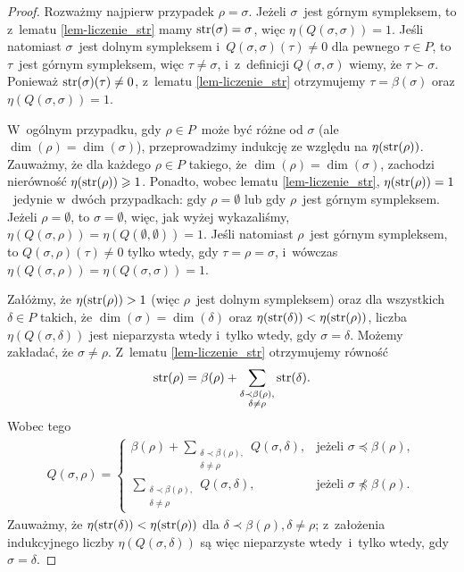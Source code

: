 \begin{proof}
Rozważmy najpierw przypadek $\rho=\sigma$. Jeżeli $\sigma$~jest górnym sympleksem, to z~lematu \ref{lem-liczenie_str} mamy $\operatorname{str}(\sigma)=\sigma$, więc $\eta(Q(\sigma,\sigma))=1$. Jeśli natomiast $\sigma$~jest dolnym sympleksem i~$Q(\sigma,\sigma)(\tau)\not=0$ dla pewnego $\tau\in P$, to $\tau$~jest górnym sympleksem, więc $\tau\not=\sigma$, i~z~definicji $Q(\sigma,\sigma)$ wiemy, że $\tau\succ\sigma$. Ponieważ $\operatorname{str}(\sigma)(\tau)\not=0$, z~lematu \ref{lem-liczenie_str} otrzymujemy $\tau=\beta(\sigma)$ oraz $\eta(Q(\sigma,\sigma))=1$.

W~ogólnym przypadku, gdy $\rho\in P$~może być różne od $\sigma$ (ale $\dim(\rho)=\dim(\sigma)$), przeprowadzimy indukcję ze względu na $\eta(\operatorname{str}(\rho))$. Zauważmy, że dla każdego $\rho\in P$ takiego, że $\dim(\rho)=\dim(\sigma)$, zachodzi nierówność $\eta(\operatorname{str}(\rho))\geqslant 1$. Ponadto, wobec lematu \ref{lem-liczenie_str}, $\eta(\operatorname{str}(\rho))=1$~jedynie w~dwóch przypadkach: gdy $\rho=\emptyset$ lub gdy $\rho$~jest górnym sympleksem. Jeżeli $\rho=\emptyset$, to $\sigma=\emptyset$, więc, jak wyżej wykazaliśmy, $\eta(Q(\sigma,\rho))=\eta(Q(\emptyset,\emptyset))=1$. Jeśli natomiast $\rho$~jest górnym sympleksem, to $Q(\sigma,\rho)(\tau)\not=0$ tylko wtedy, gdy $\tau=\rho=\sigma$, i~wówczas $\eta(Q(\sigma,\rho))=\eta(Q(\sigma,\sigma))=1$.

Załóżmy, że $\eta(\operatorname{str}(\rho))>1$ (więc $\rho$~jest dolnym sympleksem) oraz dla wszystkich $\delta\in P$ takich, że $\dim(\sigma)=\dim(\delta)$ oraz $\eta(\operatorname{str}(\delta))<\eta(\operatorname{str}(\rho))$, liczba $\eta(Q(\sigma,\delta))$ jest nieparzysta wtedy i~tylko wtedy, gdy $\sigma=\delta$. Możemy zakładać, że $\sigma\not=\rho$. Z~lematu \ref{lem-liczenie_str} otrzymujemy równość \[\operatorname{str}(\rho)=\beta(\rho)+\sum_{\substack{\delta\prec\beta(\rho),\\\delta\not=\rho}}\operatorname{str}(\delta).\] Wobec tego \begin{align}Q(\sigma,\rho)=\begin{cases}\beta(\rho)+\sum\limits_{\substack{\delta\prec\beta(\rho),\\\delta\not=\rho}}Q(\sigma,\delta), & \text{jeżeli }\sigma\preceq \beta(\rho),\\ \sum\limits_{\substack{\delta\prec\beta(\rho),\\\delta\not=\rho}}Q(\sigma,\delta), & \text{jeżeli } \sigma\not\preceq\beta(\rho).\end{cases}\label{wzor_na_Q}\end{align} Zauważmy, że $\eta(\operatorname{str}(\delta))<\eta(\operatorname{str}(\rho))$ dla $\delta\prec\beta(\rho), \delta\not=\rho$; z~założenia indukcyjnego liczby $\eta(Q(\sigma,\delta))$ są więc nieparzyste wtedy~i~tylko wtedy, gdy $\sigma=\delta$. 


\end{proof}
